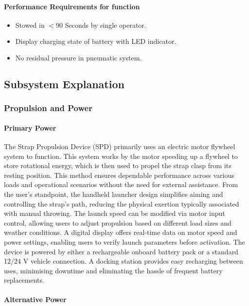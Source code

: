 \documentclass[a4paper,10pt]{article} %
\begin{document}
\paragraph{Performance Requirements for function}

\begin{itemize}
    \item Stowed in $<90$ Seconds by single operator.
    \item Display charging state of battery with LED indicator.
    \item No residual pressure in pneumatic system.
\end{itemize}


\newpage

\subsection{Subsystem Explanation}

\subsubsection{Propulsion and Power}

\paragraph{Primary Power} 

The Strap Propulsion Device (SPD) primarily uses an electric motor flywheel system to function. This system works by the motor speeding up a flywheel to store rotational energy, which is then used to propel the strap clasp from its resting position. This method ensures dependable performance across various loads and operational scenarios without the need for external assistance. From the user's standpoint, the handheld launcher design simplifies aiming and controlling the strap's path, reducing the physical exertion typically associated with manual throwing. The launch speed can be modified via motor input control, allowing users to adjust propulsion based on different load sizes and weather conditions. A digital display offers real-time data on motor speed and power settings, enabling users to verify launch parameters before activation. The device is powered by either a rechargeable onboard battery pack or a standard 12/24 V vehicle connection. A docking station provides easy recharging between uses, minimising downtime and eliminating the hassle of frequent battery replacements.


\paragraph{Alternative Power} 
\end{document}
